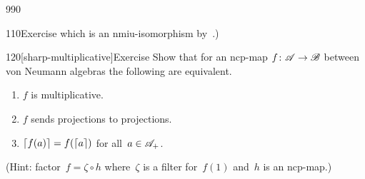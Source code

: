 \begin{parsec}{990}
\begin{point}{110}{Exercise}
which is an nmiu-isomorphism by~.)
\end{point}
\begin{point}{120}[sharp-multiplicative]{Exercise}%
Show that for an ncp-map $f\colon \mathscr{A}\to\mathscr{B}$
between von Neumann algebras
the following are equivalent.
\begin{enumerate}
\item
$f$ is multiplicative.
\item
$f$ sends projections to projections.
\item
$\left\lceil f(a)\right\rceil=f(\left\lceil a\right\rceil)$
for all~$a \in\mathscr{A}_+$.
\end{enumerate}
(Hint: factor~$f=\zeta \circ h$
where~$\zeta$ is a filter for~$f(1)$
and~$h$ is an ncp-map.)
\end{point}
\end{parsec}
